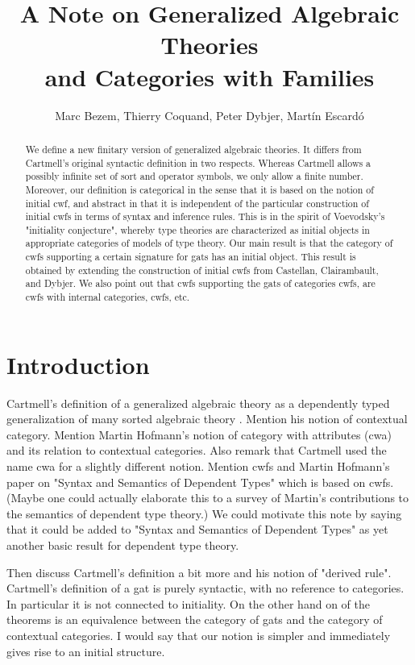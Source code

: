 \documentclass{lmcs}
\title[Generalized Algebraic Theories and Categories with Families]{A Note on Generalized Algebraic Theories\\and Categories with Families}\author{Marc Bezem, Thierry Coquand, Peter Dybjer, Mart\'in Escard\'o}
\begin{document}
\maketitle

\begin{abstract}
We define a new finitary version of generalized algebraic theories. It differs from Cartmell's original syntactic definition in two respects. Whereas Cartmell allows a possibly infinite set of sort and operator symbols, we only allow a finite number. Moreover, our definition is categorical in the sense that it is based on the notion of initial cwf, and abstract in that it is independent of the particular construction of initial cwfs in terms of syntax and inference rules. This is in the spirit of Voevodsky's "initiality conjecture", whereby type theories are characterized as initial objects in appropriate categories of models of type theory.  Our main result is that the category of cwfs supporting a certain signature for gats has an initial object. This result is obtained by extending the construction of initial cwfs from Castellan, Clairambault, and Dybjer. We also point out that cwfs supporting the gats of categories cwfs, are cwfs with internal categories, cwfs, etc.
\end{abstract}

\section{Introduction}

Cartmell's definition of a generalized algebraic theory as a dependently typed generalization of many sorted algebraic theory \cite{cartmell:phd,cartmell:}. Mention his notion of contextual category. Mention Martin Hofmann's notion of category with attributes (cwa) and its relation to contextual categories. Also remark that Cartmell used the name cwa for a slightly different notion. Mention cwfs and Martin Hofmann's paper on "Syntax and Semantics of Dependent Types" which is based on cwfs. (Maybe one could actually elaborate this to a survey of Martin's contributions to the semantics of dependent type theory.) We could motivate this note by saying that it could be added to "Syntax and Semantics of Dependent Types" as yet another basic result for dependent type theory.

Then discuss Cartmell's definition a bit more and his notion of "derived rule". Cartmell's definition of a gat is purely syntactic, with no reference to categories. In particular it is not connected to initiality. On the other hand on of the theorems is an equivalence between the category of gats and the category of contextual categories. I would say that our notion is simpler and immediately gives rise to an initial structure.
\end{document}
